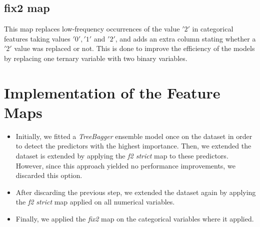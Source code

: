 \subsection{fix2 map} 
This map replaces low-frequency occurrences of the value $'2'$ in categorical features taking values $'0','1'$ and $'2'$, and adds an extra column stating whether a $'2'$ value was replaced or not. This is done to improve the efficiency of the models by replacing one ternary variable with two binary variables. 


\section{Implementation of the Feature Maps}

\begin{itemize}
\item Initially, we fitted a \textit{TreeBagger} ensemble model once on the dataset in order to detect the predictors with the highest importance. Then, we extended the dataset is extended by applying the \textit{f2 strict} map to these predictors. However, since this approach yielded no performance improvements, we discarded this option.
\item After discarding the previous step, we extended the dataset again by applying the \textit{f2 strict} map applied on all numerical variables.
\item Finally, we applied the \textit{fix2} map on the categorical variables where it applied.
\end{itemize}








